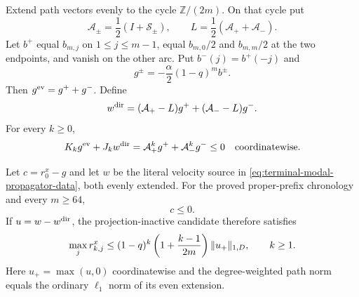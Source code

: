 \begin{lemma}
\label{lem:terminal-modal-directed-packet}
Extend path vectors evenly to the cycle $\mathbb Z/(2m)$.  On that cycle put
\[
 \mathcal A_\pm=\frac12(I+\mathcal S_\pm),\qquad
 L=\frac12(\mathcal A_++\mathcal A_-).
\]
Let $b^+$ equal $b_{m,j}$ on $1\le j\le m-1$, equal
$b_{m,0}/2$ and $b_{m,m}/2$ at the two endpoints, and vanish on the other
arc.  Put $b^-(j)=b^+(-j)$ and
\[
 g^\pm=-\frac{\alpha}{2}(1-q)^m b^\pm.
\]
Then $g^{\rm ev}=g^++g^-$.  Define
\begin{equation}
 w^{\rm dir}=(\mathcal A_+-L)g^+
             +(\mathcal A_--L)g^-.
 \label{eq:terminal-modal-directed-velocity}
\end{equation}
For every $k\ge0$,
\begin{equation}
 K_kg^{\rm ev}+J_kw^{\rm dir}
 =\mathcal A_+^kg^++\mathcal A_-^kg^-\le0
 \quad\hbox{coordinatewise}.
 \label{eq:terminal-modal-directed-sign}
\end{equation}

Let $c=r_0^x-g$ and let $w$ be the literal velocity source in
\eqref{eq:terminal-modal-propagator-data}, both evenly extended.  For the
proved proper-prefix chronology and every $m\ge64$,
\begin{equation}
 c\le0.
 \label{eq:terminal-modal-entry-correction-sign}
\end{equation}
If $u=w-w^{\rm dir}$, the projection-inactive candidate therefore satisfies
\begin{equation}
 \max_j r_{k,j}^x
 \le (1-q)^k\left(1+\frac{k-1}{2m}\right)
       \lVert u_+\rVert_{1,D},
 \qquad k\ge1.
 \label{eq:terminal-modal-directed-positive-bound}
\end{equation}
Here $u_+=\max(u,0)$ coordinatewise and the degree-weighted path norm equals
the ordinary $\ell_1$ norm of its even extension.
\end{lemma}

